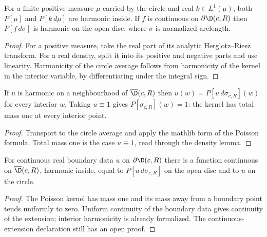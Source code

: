 \begin{theorem}
  \label{thm:harmonic_poisson_integral}
  \leanok
  For a finite positive measure $\mu$ carried by the circle and real
  $k\in L^1(\mu)$, both $P[\mu]$ and $P[k\,d\mu]$ are harmonic inside.
  If $f$ is continuous on $\partial\D(c,R)$ then $P[f\,d\sigma]$ is harmonic on
  the open disc, where $\sigma$ is normalized arclength.
  \begin{proof}
    \leanok
    For a positive measure, take the real part of its analytic
    Herglotz--Riesz transform. For a real density, split it into its positive
    and negative parts and use linearity.
    Harmonicity of the circle average follows from harmonicity of the kernel in
    the interior variable, by differentiating under the integral sign.
  \end{proof}
\end{theorem}

\begin{theorem}
  \label{thm:poisson_reproducing}
  \leanok
  If $u$ is harmonic on a neighbourhood of $\overline{\D}(c,R)$ then
  $u(w)=P[u\,d\sigma_{c,R}](w)$ for every interior $w$. Taking $u\equiv 1$ gives
  $P[\sigma_{c,R}](w)=1$: the kernel has total mass one at every interior point.
  \begin{proof}
    \leanok
    Transport to the circle average and apply the mathlib form of the Poisson
    formula. Total mass one is the case $u\equiv 1$, read through the density
    lemma.
  \end{proof}
\end{theorem}

\begin{theorem}
  \label{thm:poisson_extension}
  \leanok
  For continuous real boundary data $u$ on $\partial\D(c,R)$ there is a function
  continuous on $\overline{\D}(c,R)$, harmonic inside, equal to
  $P[u\,d\sigma_{c,R}]$ on the open disc and to $u$ on the circle.

  \begin{proof}
    \notready
    The Poisson kernel has mass one and its mass away from a boundary
    point tends uniformly to zero. Uniform continuity of the boundary data
    gives continuity of the extension; interior harmonicity is already
    formalized. The continuous-extension declaration still has an open proof.
  \end{proof}
\end{theorem}

